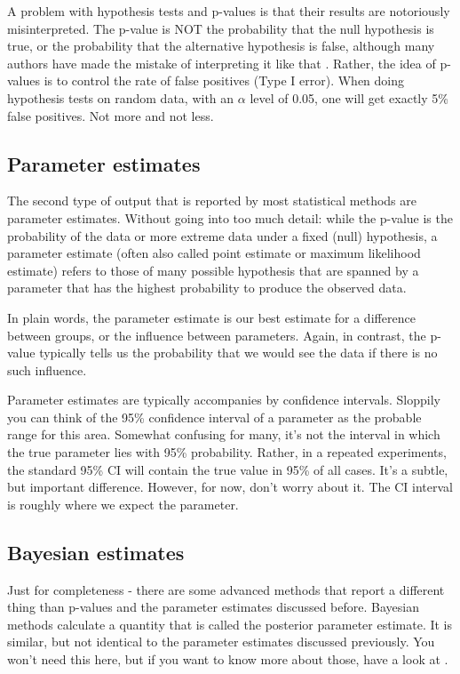 \documentclass{tufte-book} %
\begin{document}
A problem with hypothesis tests and p-values is that their results are notoriously misinterpreted. The p-value is NOT the probability that the null hypothesis is true, or the probability that the alternative hypothesis is false, although many authors have made the mistake of interpreting it like that \citep[][]{Cohen-earthisround-1994}. Rather, the idea of p-values is to control the rate of false positives (Type I error). When doing hypothesis tests on random data, with an $\alpha$ level of 0.05, one will get exactly 5\% false positives. Not more and not less.  

\subsection{Parameter estimates}

The second type of output that is reported by most statistical methods are parameter estimates. Without going into too much detail: while the p-value is the probability of the data or more extreme data under a fixed (null) hypothesis, a parameter estimate (often also called point estimate or maximum likelihood estimate) refers to those of many possible hypothesis that are spanned by a parameter that has the highest probability to produce the observed data. 

In plain words, the parameter estimate is our best estimate for a difference between groups, or the influence between parameters. Again, in contrast, the p-value typically tells us the probability that we would see the data if there is no such influence. 

Parameter estimates are typically accompanies by confidence intervals. Sloppily you can think of the 95\% confidence interval of a parameter as the probable range for this area. Somewhat confusing for many, it's not the interval in which the true parameter lies with 95\% probability. Rather, in a repeated experiments, the standard 95\% CI will contain the true value in 95\% of all cases. It's a subtle, but important difference. However, for now, don't worry about it. The CI interval is roughly where we expect the parameter. 

\subsection{Bayesian estimates}

Just for completeness - there are some advanced methods that report a different thing than p-values and the parameter estimates discussed before. Bayesian methods calculate a quantity that is called the posterior parameter estimate. It is similar, but not identical to the parameter estimates discussed previously. You won't need this here, but if you want to know more about those, have a look at \citep{Gelman-BayesianDataAnalysis-2003}.
\end{document}
